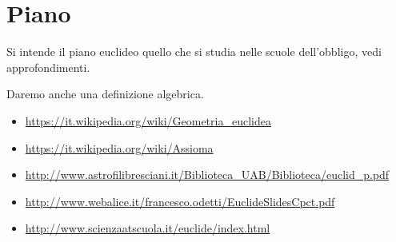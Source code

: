 \section{Piano}
\begin{definizione}
Si intende il piano euclideo quello che si studia nelle scuole dell'obbligo, vedi approfondimenti.
\end{definizione}

\begin{osservazione}
Daremo anche una definizione algebrica.
\end{osservazione}

\begin{osservazione}
\begin{itemize}
 \item \url{https://it.wikipedia.org/wiki/Geometria_euclidea}
 \item \url{https://it.wikipedia.org/wiki/Assioma}
 \item \url{http://www.astrofilibresciani.it/Biblioteca_UAB/Biblioteca/euclid_p.pdf}
 \item \url{http://www.webalice.it/francesco.odetti/EuclideSlidesCpct.pdf}
 \item \url{http://www.scienzaatscuola.it/euclide/index.html}
\end{itemize}
\end{osservazione}

